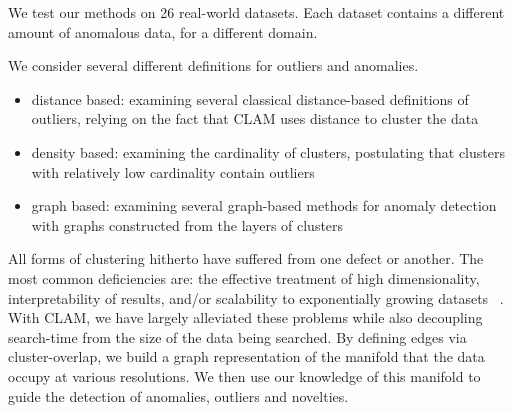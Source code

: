 We test our methods on 26 real-world datasets. 
Each dataset contains a different amount of anomalous data, for a different domain.

We consider several different definitions for outliers and anomalies.

\begin{itemize}
    \item distance based: examining several classical distance-based definitions of outliers, relying on the fact that CLAM uses distance to cluster the data
    \item density based: examining the cardinality of clusters, postulating that clusters with relatively low cardinality contain outliers
    \item graph based: examining several graph-based methods for anomaly detection with graphs constructed from the layers of clusters
\end{itemize}

All forms of clustering hitherto have suffered from one defect or another.
The most common deficiencies are: the effective treatment of high dimensionality, interpretability of results, and/or scalability to exponentially growing datasets ~\cite{rakesh_agrawal_automatic_1998}.
With CLAM, we have largely alleviated these problems while also decoupling search-time from the size of the data being searched.
By defining edges via cluster-overlap, we build a graph representation of the manifold that the data occupy at various resolutions.
We then use our knowledge of this manifold to guide the detection of anomalies, outliers and novelties.


